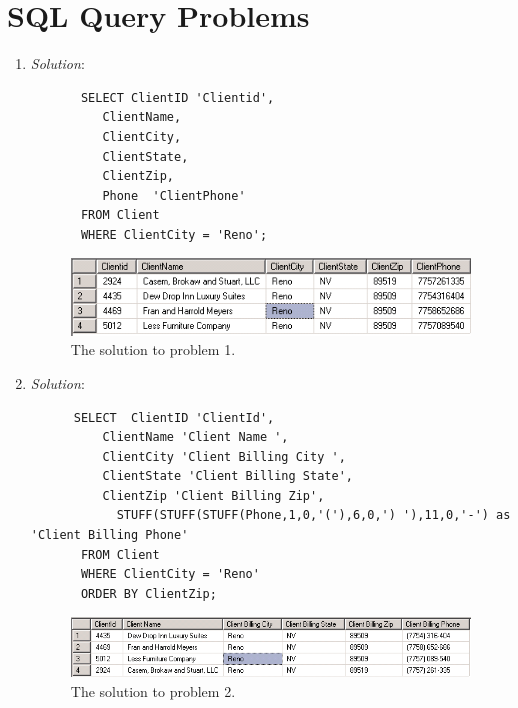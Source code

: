 \documentclass{article}
\begin{document}
\section{SQL Query Problems}
\begin{enumerate}
  \item %
  \textit{Solution}:
  \begin{verbatim}
       SELECT ClientID 'Clientid',
          ClientName,
          ClientCity,
          ClientState,
          ClientZip,
          Phone  'ClientPhone'
       FROM Client
       WHERE ClientCity = 'Reno';
  \end{verbatim}

  \begin{figure}[h!]
    \centering
    \includegraphics[width=.8\linewidth]{QueryResults/HW04_Problem01_query}
    \caption{The solution to problem 1.}
    \label{fig:HW04_Problem01}
  \end{figure}

  \newpage
  \item %
  \textit{Solution}:
  \begin{verbatim}
      SELECT  ClientID 'ClientId',
          ClientName 'Client Name ',
          ClientCity 'Client Billing City ',
          ClientState 'Client Billing State',
          ClientZip 'Client Billing Zip',
            STUFF(STUFF(STUFF(Phone,1,0,'('),6,0,') '),11,0,'-') as 'Client Billing Phone'
       FROM Client
       WHERE ClientCity = 'Reno'
       ORDER BY ClientZip;
  \end{verbatim}

  \begin{figure}[h!]
    \centering
    \includegraphics[width=.8\linewidth]{QueryResults/HW04_Problem02_query}
    \caption{The solution to problem 2.}
    \label{fig:HW04_Problem02}
  \end{figure}


\end{enumerate}
\end{document}
